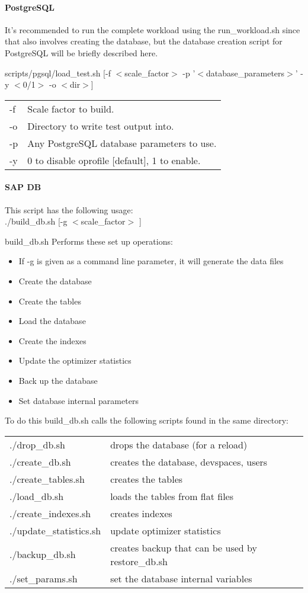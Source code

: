 \documentclass{article}
\begin{document}
\paragraph{PostgreSQL}
\noindent
It's recommended to run the complete workload using the run\_workload.sh 
since that also involves creating the database, but the database creation
script for PostgreSQL will be briefly described here.

\noindent
scripts/pgsql/load\_test.sh [-f $<$scale\_factor$>$ -p '$<$database\_parameters$>$' -y $<$0/1$>$ -o $<$dir$>$]
\begin{tabular}[c]{ll} 
-f      & Scale factor to build. \\
-o      & Directory to write test output into. \\
-p      & Any PostgreSQL database parameters to use. \\
-y      & 0 to disable oprofile [default], 1 to enable. \\
\end{tabular}

\paragraph{SAP DB}
This script has the following usage: \\
\indent ./build\_db.sh [-g $<$scale\_factor$>$ ]

\noindent
build\_db.sh  Performs these set up operations: \\
\begin{itemize}
\item If -g is given as a command line parameter, it will generate the data files
\item Create the database
\item Create the tables
\item Load the database
\item Create the indexes
\item Update the optimizer statistics
\item Back up the database
\item Set database internal parameters
\end{itemize}

\noindent
To do this build\_db.sh calls the following scripts found in the same
directory: \\
\begin{tabular}[c]{ll}
./drop\_db.sh		& drops the database (for a reload) \\
./create\_db.sh		& creates the database, devspaces, users \\
./create\_tables.sh	& creates the tables \\
./load\_db.sh		& loads the tables from flat files \\
./create\_indexes.sh	& creates indexes \\
./update\_statistics.sh	& update optimizer statistics \\
./backup\_db.sh		& creates backup that can be used by restore\_db.sh \\
./set\_params.sh	& set the database internal variables \\
\end{tabular}
\end{document}

